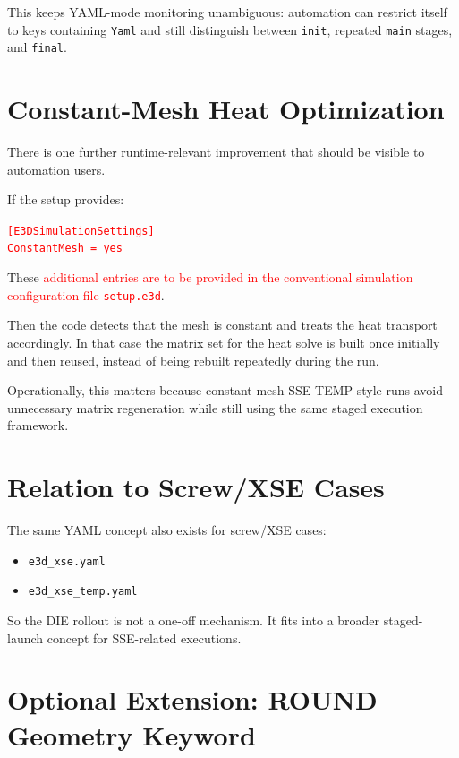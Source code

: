 \documentclass[11pt,a4paper]{article}
\begin{document}
This keeps YAML-mode monitoring unambiguous: automation can restrict itself to keys containing \texttt{Yaml} and
still distinguish between \texttt{init}, repeated \texttt{main} stages, and \texttt{final}.

\section*{Constant-Mesh Heat Optimization}

There is one further runtime-relevant improvement that should be visible to automation users.

If the setup provides:

\begin{flushleft}
\textcolor{red}{\texttt{[E3DSimulationSettings]}}\\
\textcolor{red}{\texttt{ConstantMesh = yes}}
\end{flushleft}

These \textcolor{red}{additional entries are to be provided in the conventional simulation
configuration file \texttt{setup.e3d}}.

Then the code detects that the mesh is constant and treats the heat transport accordingly. In that case the matrix
set for the heat solve is built once initially and then reused, instead of being rebuilt repeatedly during the run.

Operationally, this matters because constant-mesh SSE-TEMP style runs avoid unnecessary matrix regeneration while
still using the same staged execution framework.

\section*{Relation to Screw/XSE Cases}

The same YAML concept also exists for screw/XSE cases:

\begin{itemize}[leftmargin=*]
  \item \texttt{e3d\_xse.yaml}
  \item \texttt{e3d\_xse\_temp.yaml}
\end{itemize}

So the DIE rollout is not a one-off mechanism. It fits into a broader staged-launch concept for SSE-related
executions.

\section*{Optional Extension: ROUND Geometry Keyword}
\end{document}
